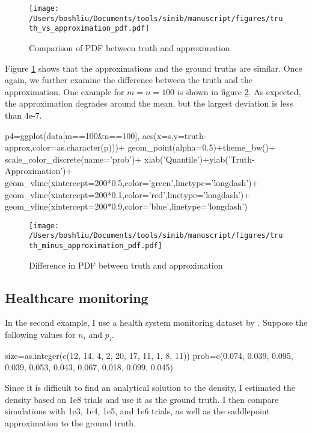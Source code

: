 \begin{figure}[h]
\texttt{[image: /Users/boshliu/Documents/tools/sinib/manuscript/figures/truth\_vs\_approximation\_pdf.pdf]}
\caption{Comparison of PDF between truth and approximation}
\label{fig:3}
\end{figure}

Figure \ref{fig:3} shows that the approximations and the ground truths are similar. Once again, we further examine the difference between the truth and the approximation. One example for $m=n=100$ is shown in figure \ref{fig:4}. As expected, the approximation degrades around the mean, but the largest deviation is less than 4e-7.


\begin{example}
p4=ggplot(data[m==100&n==100],
	aes(x=s,y=truth-approx,color=as.character(p)))+
	geom_point(alpha=0.5)+theme_bw()+
	scale_color_discrete(name='prob')+
	xlab('Quantile')+ylab('Truth-Approximation')+
	geom_vline(xintercept=200*0.5,color='green',linetype='longdash')+
	geom_vline(xintercept=200*0.1,color='red',linetype='longdash')+
	geom_vline(xintercept=200*0.9,color='blue',linetype='longdash')
\end{example}

\begin{figure}[h]
\texttt{[image: /Users/boshliu/Documents/tools/sinib/manuscript/figures/truth\_minus\_approximation\_pdf.pdf]}
\caption{Difference in PDF between truth and approximation}
\label{fig:4}
\end{figure}


\subsection{Healthcare monitoring}
In the second example, I use a health system monitoring dataset by \cite{Benneyan:2010ex}. Suppose the following values for $n_i$ and $p_i$. 

\begin{example}
size=as.integer(c(12, 14, 4, 2, 20, 17, 11, 1, 8, 11))
prob=c(0.074, 0.039, 0.095, 0.039, 0.053, 0.043, 0.067, 0.018, 0.099, 0.045)
\end{example}

Since it is difficult to find an analytical solution to the density, I estimated the density based on 1e8 trials and use it as the ground truth. I then compare simulations with 1e3, 1e4, 1e5, and 1e6 trials, as well as the saddlepoint approximation to the ground truth. 

